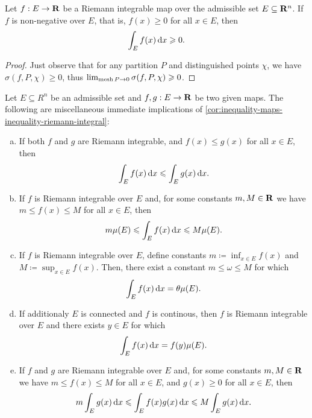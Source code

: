 \begin{proposition}
\label{prop:non-negative-real-valued-integral-non-negative}
Let \(f: E \to \mathbf{R}\) be a Riemann integrable map over the admissible set \(E
\subseteq \mathbf{R}^{n}\). If \(f\) is non-negative over \(E\), that is, \(f(x) \geq
0\) for all \(x \in E\), then
\[
  \int_E f(x)\, \mathrm{d} x \geqslant 0.
\]
\end{proposition}

\begin{proof}
Just observe that for any partition \(P\) and distinguished points \(\chi\), we
have \(\sigma(f, P, \chi) \geq 0\), thus \(\lim_{\operatorname{mesh} P \to 0} \sigma(f, P,
\chi) \geqslant 0\).
\end{proof}

\begin{corollary}
\label{cor:inequality-maps-inequality-riemann-integral}
Let \(E \subseteq R^n\) be an admissible set and \(f, g: E \to \mathbf{R}\) be two given
maps. The following are miscellaneous immediate implications of
\cref{cor:inequality-maps-inequality-riemann-integral}:
\begin{enumerate}[(a)]\setlength\itemsep{0em}
\item If both \(f\) and \(g\) are Riemann integrable, and \(f(x) \leq g(x)\) for
  all \(x \in E\), then
  \[
    \int_E f(x)\, \mathrm{d} x \leqslant \int_E g(x)\, \mathrm{d} x.
  \]

\item If \(f\) is Riemann integrable over \(E\) and, for some constants \(m, M
  \in \mathbf{R}\) we have \(m \leq f(x) \leq M\) for all \(x \in E\), then
  \[
    m \mu(E) \leqslant \int_E f(x)\, \mathrm{d} x \leqslant M \mu(E).
  \]

\item If \(f\) is Riemann integrable over \(E\), define constants \(m
  \coloneq \inf_{x \in E} f(x)\) and \(M \coloneq \sup_{x \in E} f(x)\). Then,
  there exist a constant \(m \leq \omega \leq M\) for which
  \[
    \int_E f(x)\, \mathrm{d} x = \theta \mu(E).
  \]

\item If additionaly \(E\) is connected and \(f\) is continous, then \(f\) is
  Riemann integrable over \(E\) and there exists \(y \in E\) for which
  \[
    \int_E f(x)\, \mathrm{d} x = f(y) \mu(E).
  \]

\item If \(f\) and \(g\) are Riemann integrable over \(E\) and, for some
  constants \(m, M \in \mathbf{R}\) we have \(m \leq f(x) \leq M\) for all \(x \in E\),
  and \(g(x) \geq 0\) for all \(x \in E\), then
  \[
    m \int_E g(x)\, \mathrm{d} x \leqslant \int_E f(x) g(x)\, \mathrm{d} x
    \leqslant M \int_E g(x)\, \mathrm{d} x.
  \]
\end{enumerate}
\end{corollary}

